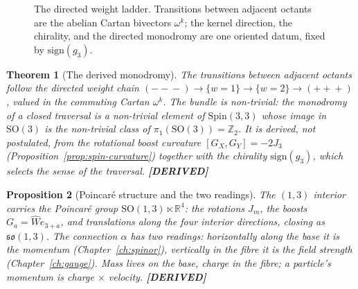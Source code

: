 \documentclass[11pt,oneside]{book}
\newcommand{\Wh}{\hat{W}}                         %
\newcommand{\Zt}{\mathbb{Z}_2}
\newcommand{\RR}{\mathbb{R}}
\newcommand{\so}{\mathfrak{so}}
\newcommand{\Spin}{\mathrm{Spin}}
\newcommand{\status}[1]{{\sffamily\bfseries\color{statuscol}[#1]}}
\theoremstyle{plain}
\newtheorem{theorem}{Theorem}[chapter]
\newtheorem{proposition}[theorem]{Proposition}
\theoremstyle{definition}
\theoremstyle{remark}
\begin{document}
\begin{figure}[t]
\centering
{}
\caption{The directed weight ladder. Transitions between adjacent
octants are the abelian Cartan bivectors $\omega^k$; the kernel direction, the
chirality, and the directed monodromy are one oriented datum, fixed by
$\mathrm{sign}(g_3)$.}
\label{fig:ladder}
\end{figure}

\begin{theorem}[The derived monodromy]
\label{thm:monodromy}
The transitions between adjacent octants follow the directed weight chain
$(-\!-\!-)\to\{w{=}1\}\to\{w{=}2\}\to(+\!+\!+)$, valued in the commuting Cartan
$\omega^k$. The bundle is non-trivial: the monodromy of a closed traversal is a
non-trivial element of $\Spin(3,3)$ whose image in $\mathrm{SO}(3)$ is the
non-trivial class of $\pi_1(\mathrm{SO}(3))=\Zt$. It is \emph{derived}, not
postulated, from the rotational boost curvature
$[G_X,G_Y]=-2J_3$ (Proposition~\ref{prop:spin-curvature}) together with the chirality
$\mathrm{sign}(g_3)$, which selects the sense of the traversal. \status{DERIVED}
\end{theorem}

\begin{proposition}[Poincar\'e structure and the two readings]
\label{prop:poincare}
The $(1,3)$ interior carries the Poincar\'e group
$\mathrm{SO}(1,3)\ltimes\RR^4$: the rotations $J_m$, the boosts $G_a=\Wh e_{3+a}$, and
translations along the four interior directions, closing as $\so(1,3)$. The
connection $\alpha$ has two readings: horizontally along the base it is the momentum
(Chapter~\ref{ch:spinor}), vertically in the fibre it is the field strength
(Chapter~\ref{ch:gauge}). Mass lives on the base, charge in the fibre; a particle's
momentum is charge $\times$ velocity. \status{DERIVED}
\end{proposition}
\end{document}
